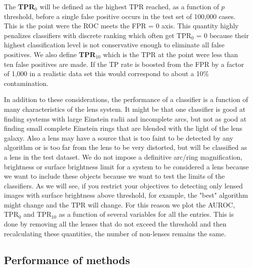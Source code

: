 \documentclass{aa}
\begin{document}
The {\bf TPR$_0$} will be defined as the highest TPR reached, as a function of $p$ threshold, before a single false positive occurs in the test set of 100,000 cases.  This is the point were the ROC meets the FPR = 0 axis.  This quantity highly penalizes classifiers with discrete ranking which often get TPR$_0$ = 0 because their highest classification level is not conservative enough to eliminate all false positives.  We also define {\bf TPR$_{10}$} which is the TPR at the point were less than ten false positives are made.  If the TP rate is boosted from the FPR by a factor of 1,000 in a realistic data set this would correspond to about a 10\% contamination.

In addition to these considerations, the performance of a classifier is a function of many characteristics of the lens system.  It might be that one classifier is good at finding systems with large Einstein radii and incomplete arcs, but not as good at finding small complete Einstein rings that are blended with the light of the lens galaxy.  Also a lens may have a source that is too faint to be detected by any algorithm or is too far from the lens to be very distorted, but will be classified as a lens in the test dataset.    We do not impose a definitive arc/ring magnification, brightness or surface brightness limit for a system to be considered a lens because we 
want to include these objects because we want to test the limits of the classifiers.  As we will see, if you restrict your objectives to detecting only lensed images with surface brightness above threshold, for example, the "best" algorithm might change and the TPR will change.  For this reason we plot the AUROC, TPR$_0$ and TPR$_{10}$ as a function of several variables for all the entries.  This is done by removing all the lenses that do not exceed the threshold and then recalculating  these quantities, the number of non-lenses remains the same.

\subsection{Performance of methods}
\label{sec:performance}
\end{document}
